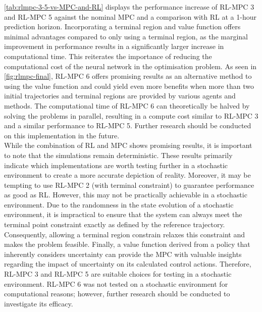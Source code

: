 \autoref{tab:rlmpc-3-5-vs-MPC-and-RL} displays the performance increase of RL-MPC 3 and RL-MPC 5 against the nominal MPC and a comparison with RL at a 1-hour prediction horizon. Incorporating a terminal region and value function offers minimal advantages compared to only using a terminal region, as the marginal improvement in performance results in a significantly larger increase in computational time. This reiterates the importance of reducing the computational cost of the neural network in the optimisation problem. As seen in \autoref{fig:rlmpc-final}, RL-MPC 6 offers promising results as an alternative method to using the value function and could yield even more benefits when more than two initial trajectories and terminal regions are provided by various agents and methods. The computational time of RL-MPC 6 can theoretically be halved by solving the problems in parallel, resulting in a compute cost similar to RL-MPC 3 and a similar performance to RL-MPC 5. Further research should be conducted on this implementation in the future.\\

While the combination of RL and MPC shows promising results, it is important to note that the simulations remain deterministic. These results primarily indicate which implementations are worth testing further in a stochastic environment to create a more accurate depiction of reality. Moreover, it may be tempting to use RL-MPC 2 (with terminal constraint) to guarantee performance as good as RL. However, this may not be practically achievable in a stochastic environment. Due to the randomness in the state evolution of a stochastic environment, it is impractical to ensure that the system can always meet the terminal point constraint exactly as defined by the reference trajectory. Consequently, allowing a terminal region constrain relaxes this constraint and makes the problem feasible. Finally, a value function derived from a policy that inherently considers uncertainty can provide the MPC with valuable insights regarding the impact of uncertainty on its calculated control actions. Therefore, RL-MPC 3 and RL-MPC 5 are suitable choices for testing in a stochastic environment. RL-MPC 6 was not tested on a stochastic environment for computational reasons; however, further research should be conducted to investigate its efficacy.


